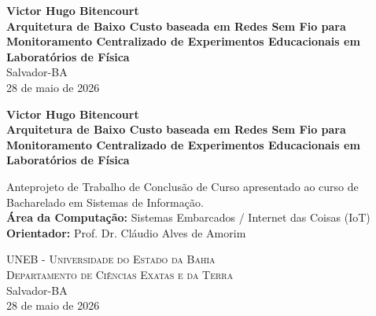 \documentclass[12pt,a4paper]{article}
\begin{document}
\begin{titlepage}
    \begin{center}
        {\large \textbf{Victor Hugo Bitencourt}} \\[7cm]
        
        {\LARGE \textbf{Arquitetura de Baixo Custo baseada em Redes Sem Fio para Monitoramento Centralizado de Experimentos Educacionais em Laboratórios de Física}} \\[8cm]
        
        {\large Salvador-BA} \\
        {\large 28 de maio de 2026}
    \end{center}
\end{titlepage}

\begin{titlepage}
    \begin{center}
        {\large \textbf{Victor Hugo Bitencourt}} \\[5cm]
        
        {\LARGE \textbf{Arquitetura de Baixo Custo baseada em Redes Sem Fio para Monitoramento Centralizado de Experimentos Educacionais em Laboratórios de Física}} \\[3cm]
        
        \begin{flushright}
            \begin{minipage}{8cm}
                Anteprojeto de Trabalho de Conclusão de Curso apresentado ao curso de Bacharelado em Sistemas de Informação.\\
                \textbf{Área da Computação:} Sistemas Embarcados / Internet das Coisas (IoT)\\
                \textbf{Orientador:} Prof. Dr. Cláudio Alves de Amorim
            \end{minipage}
        \end{flushright}
        
        \vspace{4cm}
        
        \textsc{UNEB - Universidade do Estado da Bahia}\\
        \textsc{Departamento de Ciências Exatas e da Terra} \\[2cm]
        
        {\large Salvador-BA} \\
        {\large 28 de maio de 2026}
    \end{center}
\end{titlepage}
\end{document}
